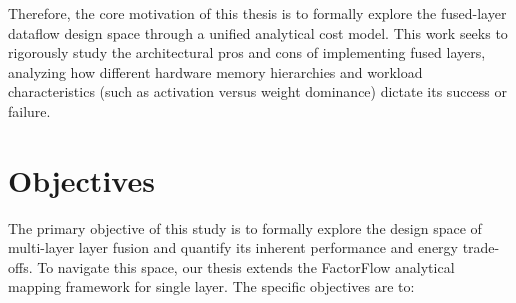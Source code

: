 Therefore, the core motivation of this thesis is to formally explore the fused-layer dataflow design space through a unified analytical cost model. This work seeks to rigorously study the architectural pros and cons of implementing fused layers, analyzing how different hardware memory hierarchies and workload characteristics (such as activation versus weight dominance) dictate its success or failure.

\section{Objectives}
\label{sec:intro-objectives}

The primary objective of this study is to formally explore the design space
of multi-layer layer fusion and quantify its inherent performance and energy
trade-offs. To navigate this space, our thesis extends
the FactorFlow analytical mapping framework for single layer. The specific objectives are to:
%
